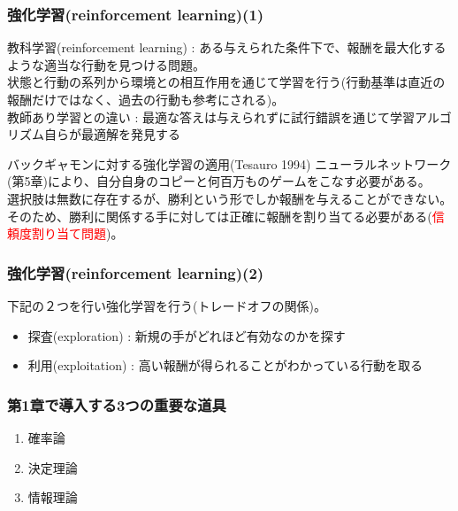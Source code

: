 \documentclass[dvipdfmx]{beamer}
\theoremstyle{definition}
\begin{document}
\begin{frame}
  \frametitle{強化学習(reinforcement learning)(1)}
  教科学習(reinforcement learning) : ある与えられた条件下で、報酬を最大化するような適当な行動を見つける問題。
  \\
  状態と行動の系列から環境との相互作用を通じて学習を行う(行動基準は直近の報酬だけではなく、過去の行動も参考にされる)。
  \\
  教師あり学習との違い : 最適な答えは与えられずに試行錯誤を通じて学習アルゴリズム自らが最適解を発見する

  \begin{block}{バックギャモンに対する強化学習の適用(Tesauro 1994)}
    ニューラルネットワーク(第5章)により、自分自身のコピーと何百万ものゲームをこなす必要がある。\\
    選択肢は無数に存在するが、勝利という形でしか報酬を与えることができない。そのため、勝利に関係する手に対しては正確に報酬を割り当てる必要がある(\textcolor{red}{信頼度割り当て問題})。
  \end{block}
\end{frame}

\begin{frame}
  \frametitle{強化学習(reinforcement learning)(2)}
  下記の２つを行い強化学習を行う(トレードオフの関係)。
  \begin{itemize}
    \item 探査(exploration) : 新規の手がどれほど有効なのかを探す
    \item 利用(exploitation) : 高い報酬が得られることがわかっている行動を取る
  \end{itemize}
\end{frame}

\begin{frame}
  \frametitle{第1章で導入する3つの重要な道具}
  \begin{enumerate}
    \item 確率論
    \item 決定理論
    \item 情報理論
  \end{enumerate}
\end{frame}
\end{document}

